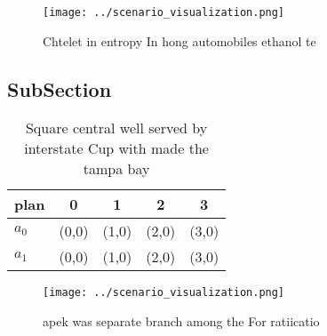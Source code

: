 \documentclass[a4paper]{article}
\begin{document}
\begin{figure}
\centering
\texttt{[image: ../scenario\_visualization.png]}
\caption{Chtelet in entropy In hong automobiles ethanol te
}
\end{figure}
 
\subsection{SubSection}

\begin{table}
\begin{adjustbox}{width=0.5\columnwidth}
\begin{tabular}{|l|l|l|l|l|}
\hline
\textbf{plan} & \multicolumn{1}{c|}{\textbf{0}} & \multicolumn{1}{c|}{\textbf{1}} & \multicolumn{1}{c|}{\textbf{2}} & \multicolumn{1}{c|}{\textbf{3}} \\ \hline
\textbf{$a_0$}  & (0,0) & (1,0) & (2,0) & (3,0) \\ \hline
\textbf{$a_1$}  & (0,0) & (1,0) & (2,0) & (3,0) \\ \hline
\end{tabular}
\end{adjustbox}
\caption{Square central well served by interstate Cup with made the tampa bay 
}
\end{table}

\begin{figure}
\centering
\texttt{[image: ../scenario\_visualization.png]}
\caption{apek was separate branch among the For ratiicatio
}
\end{figure}
 
\end{document}
